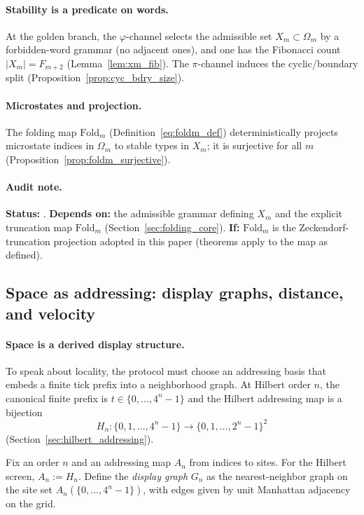 \paragraph{Stability is a predicate on words.}
At the golden branch, the $\varphi$-channel selects the admissible set $X_m\subset\Omega_m$ by a forbidden-word grammar (no adjacent ones), and one has the Fibonacci count $|X_m|=F_{m+2}$ (Lemma~\ref{lem:xm_fib}).
The $\pi$-channel induces the cyclic/boundary split (Proposition~\ref{prop:cyc_bdry_size}).

\paragraph{Microstates and projection.}
\MathTag The folding map $\mathrm{Fold}_m$ (Definition~\eqref{eq:foldm_def}) deterministically projects microstate indices in $\Omega_m$ to stable types in $X_m$; it is surjective for all $m$ (Proposition~\ref{prop:foldm_surjective}).

\paragraph{Audit note.}
\AuditTag \textbf{Status:} \MathTag.
\textbf{Depends on:} the admissible grammar defining $X_m$ and the explicit truncation map $\mathrm{Fold}_m$ (Section~\ref{sec:folding_core}).
\textbf{If:} $\mathrm{Fold}_m$ is the Zeckendorf-truncation projection adopted in this paper (theorems apply to the map as defined).

\subsection{Space as addressing: display graphs, distance, and velocity}
\label{subsec:tick_to_space}

\paragraph{Space is a derived display structure.}
To speak about locality, the protocol must choose an addressing basis that embeds a finite tick prefix into a neighborhood graph.
At Hilbert order $n$, the canonical finite prefix is $t\in\{0,\dots,4^n-1\}$ and the Hilbert addressing map is a bijection
\[
H_n:\{0,1,\dots,4^n-1\}\to \{0,1,\dots,2^n-1\}^2
\]
(Section~\ref{sec:hilbert_addressing}).

\begin{definition}
\label{def:addressing_map_graph}
Fix an order $n$ and an addressing map $A_n$ from indices to sites.
For the Hilbert screen, $A_n:=H_n$.
Define the \emph{display graph} $G_n$ as the nearest-neighbor graph on the site set $A_n(\{0,\dots,4^n-1\})$, with edges given by unit Manhattan adjacency on the grid.
\end{definition}

